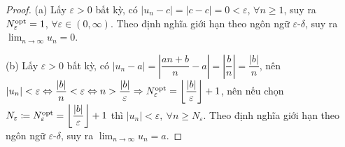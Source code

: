 \documentclass{article}
\begin{document}
\begin{proof}
	(a) Lấy $\varepsilon > 0$ bất kỳ, có $|u_n - c| = |c - c| = 0 < \varepsilon$, $\forall n\ge1$, suy ra $N_\varepsilon^{\rm opt} = 1$, $\forall\varepsilon\in(0,\infty)$. Theo định nghĩa giới hạn theo ngôn ngữ $\varepsilon$-$\delta$, suy ra $\lim_{n\to\infty} u_n = 0$.
	
	\item(b) Lấy $\varepsilon > 0$ bất kỳ, có $|u_n - a| = \left|\dfrac{an + b}{n} - a\right| = \left|\dfrac{b}{n}\right| = \dfrac{|b|}{n}$, nên $|u_n| < \varepsilon\Leftrightarrow\dfrac{|b|}{n}< \varepsilon\Leftrightarrow n > \dfrac{|b|}{\varepsilon}\Rightarrow N_\varepsilon^{\rm opt} = \left\lfloor\dfrac{|b|}{\varepsilon}\right\rfloor + 1$, nên nếu chọn $N_\varepsilon\coloneqq N_\varepsilon^{\rm opt} = \left\lfloor\dfrac{|b|}{\varepsilon}\right\rfloor + 1$ thì $|u_n| < \varepsilon,\ \forall n\ge N_\varepsilon$. Theo định nghĩa giới hạn theo ngôn ngữ $\varepsilon$-$\delta$, suy ra $\lim_{n\to\infty} u_n = a$.
\end{proof}
\end{document}
